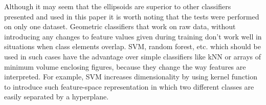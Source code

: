 Although it may seem that the ellipsoids are superior to other classifiers presented and used in this paper it is worth noting that the tests were performed on only one dataset. Geometric classifiers that work on raw data, without introducing any changes to feature values given during training don't work well in situations when class elements overlap. SVM, random forest, etc. which should be used in such cases have the advantage over simple classifiers like kNN or arrays of minimum volume enclosing figures, because they change the way features are interpreted. For example, SVM increases dimensionality by using kernel function to introduce such feature-space representation in which two different classes are easily separated by a hyperplane.
